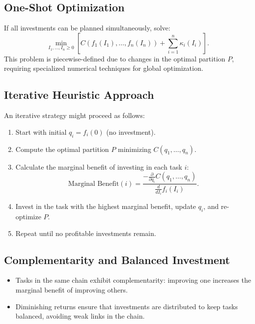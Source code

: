 \documentclass{article}
\begin{document}
\subsection{One-Shot Optimization}
If all investments can be planned simultaneously, solve:
\[
    \min_{I_1, \dots, I_n \geq 0} \left[ C(f_1(I_1), \dots, f_n(I_n)) + \sum_{i=1}^n \kappa_i(I_i) \right].
\]
This problem is piecewise-defined due to changes in the optimal partition $P$, requiring specialized numerical techniques for global optimization.

\subsection{Iterative Heuristic Approach}
An iterative strategy might proceed as follows:
\begin{enumerate}
    \item Start with initial $q_i = f_i(0)$ (no investment).
    \item Compute the optimal partition $P$ minimizing $C(q_1, \dots, q_n)$.
    \item Calculate the marginal benefit of investing in each task $i$:
    \[
        \text{Marginal Benefit}(i) = \frac{-\frac{\partial}{\partial q_i} C(q_1, \dots, q_n)}{\frac{d}{d I_i} f_i(I_i)}.
    \]
    \item Invest in the task with the highest marginal benefit, update $q_i$, and re-optimize $P$.
    \item Repeat until no profitable investments remain.
\end{enumerate}

\subsection{Complementarity and Balanced Investment}
\begin{itemize}
    \item Tasks in the same chain exhibit complementarity: improving one increases the marginal benefit of improving others.
    \item Diminishing returns ensure that investments are distributed to keep tasks balanced, avoiding weak links in the chain.
\end{itemize}
\end{document}
